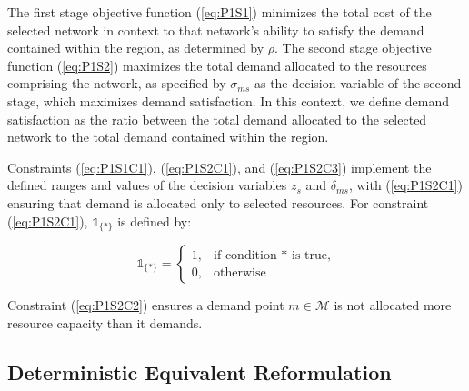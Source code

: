 \documentclass[12pt,onecolumn]{IEEEtran}
\begin{document}
The first stage objective function (\ref{eq:P1S1}) minimizes the total cost of the selected network in context to that network's ability to satisfy the demand contained within the region, as determined by $\rho$.  The second stage objective function (\ref{eq:P1S2}) maximizes the total demand allocated to the resources comprising the network, as specified by $\sigma_{ms}$ as the decision variable of the second stage, which maximizes demand satisfaction.  In this context, we define demand satisfaction as the ratio between the total demand allocated to the selected network to the total demand contained within the region.

Constraints (\ref{eq:P1S1C1}), (\ref{eq:P1S2C1}), and (\ref{eq:P1S2C3}) implement the defined ranges and values of the decision variables $z_s$ and $\delta_{ms}$, with (\ref{eq:P1S2C1}) ensuring that demand is allocated only to selected resources.  For constraint (\ref{eq:P1S2C1}), $\mathbb{1}_{\{*\}}$ is defined by:

\[ \mathbb{1}_{\{*\}} =
	\begin{cases}
		1,& \text{if condition $*$ is true,}\\
		0,& \text{otherwise}
	\end{cases}
\]

Constraint (\ref{eq:P1S2C2}) ensures a demand point $m \in \mathcal{M}$ is not allocated more resource capacity than it demands.



\subsection{Deterministic Equivalent Reformulation}
\end{document}
